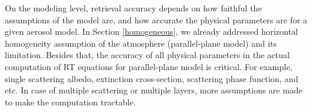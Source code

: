 On the modeling level, retrieval accuracy depends on how faithful the assumptions of the model are, and how accurate the physical parameters are for a given aerosol model. In Section \ref{homogeneous}, we already addressed horizontal homogeneity assumption of the atmosphere (parallel-plane model) and its limitation. Besides that, the accuracy of all physical parameters in the actual computation of RT equations for parallel-plane model is critical. For example, single scattering albedo, extinction cross-section, scattering phase function, and etc. In case of multiple scattering or multiple layers, more assumptions are made to make the computation tractable.\cite{liou}

